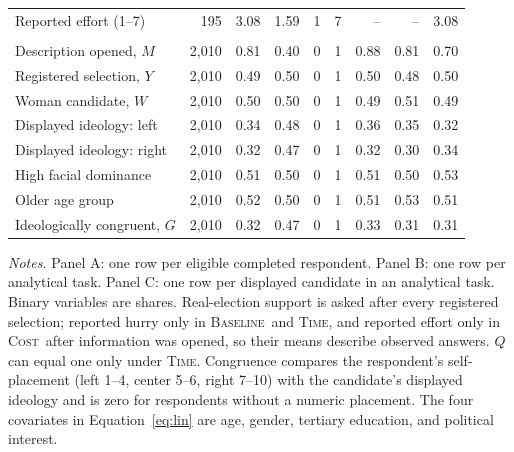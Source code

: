 \documentclass[11pt]{article}\usepackage[]{graphicx}\usepackage[]{xcolor}
\newcommand{\armT}{\textsc{Time}}
\newcommand{\armC}{\textsc{Cost}}
\newcommand{\armB}{\textsc{Baseline}}
\newenvironment{notes}{\par\smallskip\begin{minipage}{\linewidth}\footnotesize\textit{Notes.}}{\end{minipage}}
\begin{document}
\begin{table}[!htbp]
\begin{tabular}{@{}lrrrrrrrr@{}}
Reported effort (1--7) &   195 & 3.08 & 1.59 & 1 & 7 & -- & -- & 3.08 \\
\addlinespace[2pt]
\multicolumn{9}{@{}l}{\textit{C. Candidate appearances}} \\
Description opened, $M$ & 2,010 & 0.81 & 0.40 & 0 & 1 & 0.88 & 0.81 & 0.70 \\
Registered selection, $Y$ & 2,010 & 0.49 & 0.50 & 0 & 1 & 0.50 & 0.48 & 0.50 \\
Woman candidate, $W$ & 2,010 & 0.50 & 0.50 & 0 & 1 & 0.49 & 0.51 & 0.49 \\
Displayed ideology: left & 2,010 & 0.34 & 0.48 & 0 & 1 & 0.36 & 0.35 & 0.32 \\
Displayed ideology: right & 2,010 & 0.32 & 0.47 & 0 & 1 & 0.32 & 0.30 & 0.34 \\
High facial dominance & 2,010 & 0.51 & 0.50 & 0 & 1 & 0.51 & 0.50 & 0.53 \\
Older age group & 2,010 & 0.52 & 0.50 & 0 & 1 & 0.51 & 0.53 & 0.51 \\
Ideologically congruent, $G$ & 2,010 & 0.32 & 0.47 & 0 & 1 & 0.33 & 0.31 & 0.31 \\
\bottomrule
\end{tabular}

\begin{notes}
Panel A: one row per eligible completed respondent. Panel B: one row per analytical task. Panel C: one row per displayed candidate in an analytical task. Binary variables are shares. Real-election support is asked after every registered selection; reported hurry only in \armB\ and \armT, and reported effort only in \armC\ after information was opened, so their means describe observed answers. $Q$ can equal one only under \armT. Congruence compares the respondent's self-placement (left 1--4, center 5--6, right 7--10) with the candidate's displayed ideology and is zero for respondents without a numeric placement. The four covariates in Equation~\eqref{eq:lin} are age, gender, tertiary education, and political interest.
\end{notes}
\end{table}
\end{document}
